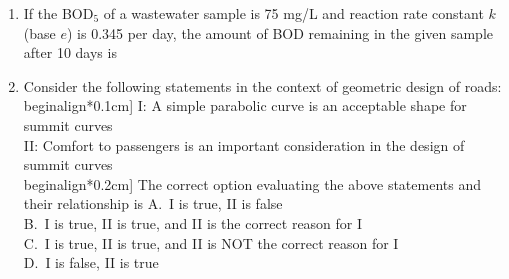 \documentclass[journal,12pt,onecolumn]{IEEEtran}
\theoremstyle{remark}
\begin{document}
\begin{enumerate}
\hfill{}
\begin{enumerate}
\end{enumerate}
\noindent\item If the BOD$_5$ of a wastewater sample is 75 mg/L and reaction rate constant $k$ (base $e$) is 0.345 per day, the amount of BOD remaining in the given sample after 10 days is
\hfill{}
\begin{enumerate}
\end{enumerate}
\noindent\item Consider the following statements in the context of geometric design of roads: \\begin{align*}0.1cm]
I: A simple parabolic curve is an acceptable shape for summit curves \\ 
II: Comfort to passengers is an important consideration in the design of summit curves \\begin{align*}0.2cm]
The correct option evaluating the above statements and their relationship is
\hfill{}\newline
A.\ I is true, II is false \\
B.\ I is true, II is true, and II is the correct reason for I \\
C.\ I is true, II is true, and II is NOT the correct reason for I \\
D.\ I is false, II is true


\end{enumerate}
\end{document}
